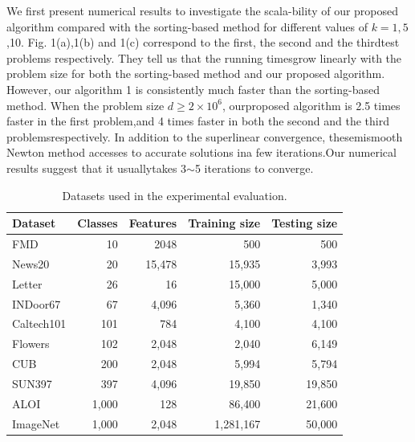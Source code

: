 \documentclass[journal]{IEEEtran}
\begin{document}
We first present numerical results to investigate the scala-bility of our proposed algorithm compared with the sorting-based method for different values of $k = 1,5$,10. Fig. 1(a),1(b) and 1(c) correspond to the first, the second and the thirdtest problems respectively. They tell us that the running timesgrow linearly with the problem size for both the sorting-based method and our proposed algorithm. However, our algorithm 1 is consistently much faster than the sorting-based method. When the problem size $d \geq 2 \times 10^6$, ourproposed algorithm is 2.5 times faster in the first problem,and 4 times faster in both the second and the third problemsrespectively. In addition to the superlinear convergence, thesemismooth Newton method accesses to accurate solutions ina few iterations.Our numerical results suggest that it usuallytakes 3$\sim$5 iterations to converge.

\begin{table}[htbp]
	\centering
	\caption{Datasets used in the experimental evaluation.}
	\begin{tabular}{l | r r r r}
		\toprule  %
		Dataset&Classes&Features&Training size&Testing size \\ 
		\midrule  %
		FMD&10&2048&500&500 \\
		News20&20&15,478&15,935&3,993 \\
		Letter&26&16&15,000&5,000\\
		INDoor67&67&4,096&5,360&1,340 \\
		Caltech101&101&784&4,100&4,100 \\
		Flowers&102&2,048&2,040&6,149 \\
		CUB&200&2,048&5,994&5,794 \\
		SUN397&397&4,096&19,850&19,850 \\
		ALOI&1,000&128&86,400&21,600 \\
		ImageNet&1,000&2,048&1,281,167&50,000 \\
		\bottomrule  %
	\end{tabular}
\end{table}
\end{document}
